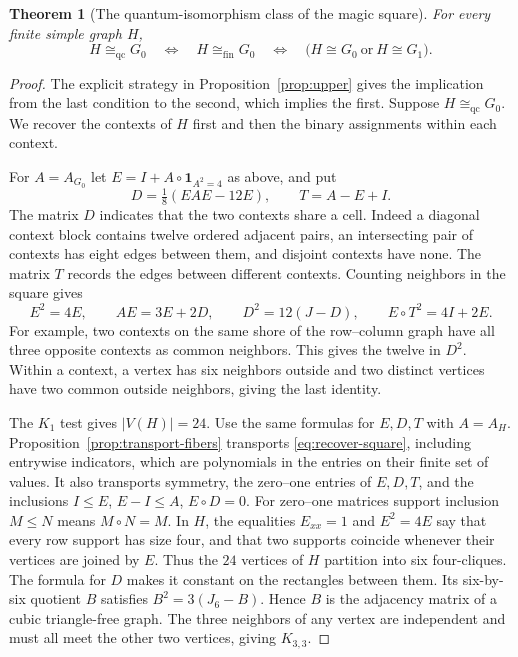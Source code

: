 \documentclass[11pt,reqno]{amsart}
\numberwithin{equation}{section}
\newtheorem{theorem}{Theorem}[section]
\theoremstyle{definition}
\newcommand{\qc}{\mathrm{qc}}
\newcommand{\qf}{\mathrm{fin}}
\begin{document}
\begin{theorem}[The quantum-isomorphism class of the magic square]\label{thm:standard-partners}
For every finite simple graph $H$,
\[
 H\cong_{\qc}G_0 \quad\Longleftrightarrow\quad H\cong_{\qf}G_0
 \quad\Longleftrightarrow\quad
               \bigl(H\cong G_0\ \text{or}\ H\cong G_1\bigr).
\]
\end{theorem}
\begin{proof}
The explicit strategy in Proposition~\ref{prop:upper} gives the implication from the last condition to the second, which implies the first. Suppose $H\cong_{\qc}G_0$. We recover the contexts of $H$ first and then the binary assignments within each context.

For $A=A_{G_0}$ let $E=I+A\circ\mathbf{1}_{A^2=4}$ as above, and put
\[
             D=\tfrac18(EAE-12E),\qquad T=A-E+I.
\]
The matrix $D$ indicates that the two contexts share a cell. Indeed a diagonal context block contains twelve ordered adjacent pairs, an intersecting pair of contexts has eight edges between them, and disjoint contexts have none. The matrix $T$ records the edges between different contexts. Counting neighbors in the square gives
\begin{equation}\label{eq:recover-square}
 E^2=4E,\qquad AE=3E+2D,\qquad
 D^2=12(J-D),\qquad E\circ T^2=4I+2E .
\end{equation}
For example, two contexts on the same shore of the row--column graph have all three opposite contexts as common neighbors. This gives the twelve in $D^2$. Within a context, a vertex has six neighbors outside and two distinct vertices have two common outside neighbors, giving the last identity.

The $K_1$ test gives $|V(H)|=24$. Use the same formulas for $E,D,T$ with $A=A_H$. Proposition~\ref{prop:transport-fibers} transports \eqref{eq:recover-square}, including entrywise indicators, which are polynomials in the entries on their finite set of values. It also transports symmetry, the zero--one entries of $E,D,T$, and the inclusions $I\le E$, $E-I\le A$, $E\circ D=0$. For zero--one matrices support inclusion $M\le N$ means $M\circ N=M$. In $H$, the equalities $E_{xx}=1$ and $E^2=4E$ say that every row support has size four, and that two supports coincide whenever their vertices are joined by $E$. Thus the $24$ vertices of $H$ partition into six four-cliques. The formula for $D$ makes it constant on the rectangles between them. Its six-by-six quotient $B$ satisfies $B^2=3(J_6-B)$. Hence $B$ is the adjacency matrix of a cubic triangle-free graph. The three neighbors of any vertex are independent and must all meet the other two vertices, giving $K_{3,3}$.


\end{proof}
\end{document}

